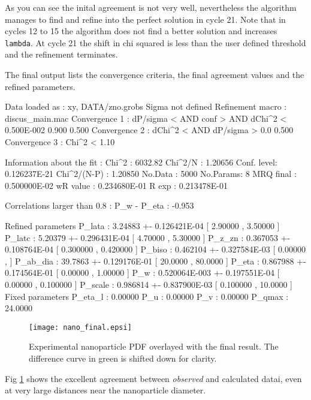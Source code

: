 As you can see the inital agreement is not very well, nevertheless the algorithm 
manages to find and refine into the perfect solution in cycle 21. Note that in 
cycles 12 to 15 the algorithm does not find a better solution and increases 
{\tt lambda}. At cycle 21 the shift in chi squared is less than the user defined 
threshold and the refinement terminates.

The final output lists the convergence criteria, the final agreement values
and the refined parameters.

\begin{MacVerbatim}
 Data loaded as     : xy, DATA/zno.grobs
 Sigma not defined  
 Refinement macro   : discus_main.mac
   Convergence 1    : dP/sigma < AND conf >     AND dChi^2 <
                      0.500E-002     0.900          0.500     
   Convergence 2    : dChi^2 <   AND dP/sigma > 0.0          
                      0.500     
   Convergence 3    : Chi^2 <                                
                       1.10     

 Information about the fit : 
   Chi^2      :  6032.82          Chi^2/N :  1.20656    
   Conf. level: 0.126237E-21  Chi^2/(N-P) :  1.20850    
   No.Data    :         5000     No.Params:            8
   MRQ final  : 0.500000E-02
   wR value   : 0.234680E-01      R exp   : 0.213478E-01

 Correlations larger than 0.8 :
   P_w              - P_eta            : -0.953
  
 Refined parameters
   P_lata           :    3.24883      +-    0.126421E-04    [   2.90000     ,   3.50000     ]
   P_latc           :    5.20379      +-    0.296431E-04    [   4.70000     ,   5.30000     ]
   P_z_zn           :   0.367053      +-    0.108764E-04    [  0.300000     ,  0.420000     ]
   P_biso           :   0.462104      +-    0.327584E-03    [   0.00000     ,               ]
   P_ab_dia         :    39.7863      +-    0.129176E-01    [   20.0000     ,   80.0000     ]
   P_eta            :   0.867988      +-    0.174564E-01    [   0.00000     ,   1.00000     ]
   P_w              :   0.520064E-003 +-    0.197551E-04    [   0.00000     ,  0.100000     ]
   P_scale          :   0.986814      +-    0.837900E-03    [  0.100000     ,   10.0000     ]
 Fixed   parameters
   P_eta_l          :    0.00000     
   P_u              :    0.00000     
   P_v              :    0.00000     
   P_qmax           :    24.0000     
\end{MacVerbatim}

\begin{figure}
   \texttt{[image: nano\_final.epsi]}
   \caption{Experimental nanoparticle PDF overlayed with the final result.
   The difference curve in green is shifted down for clarity.
   }
   \label{fexa-nano-fin}
\end{figure}

Fig \ref{fexa-nano-fin} shows the excellent agreement between {\it observed} and 
calculated datai, even at very large distances near the nanoparticle 
diameter. 

